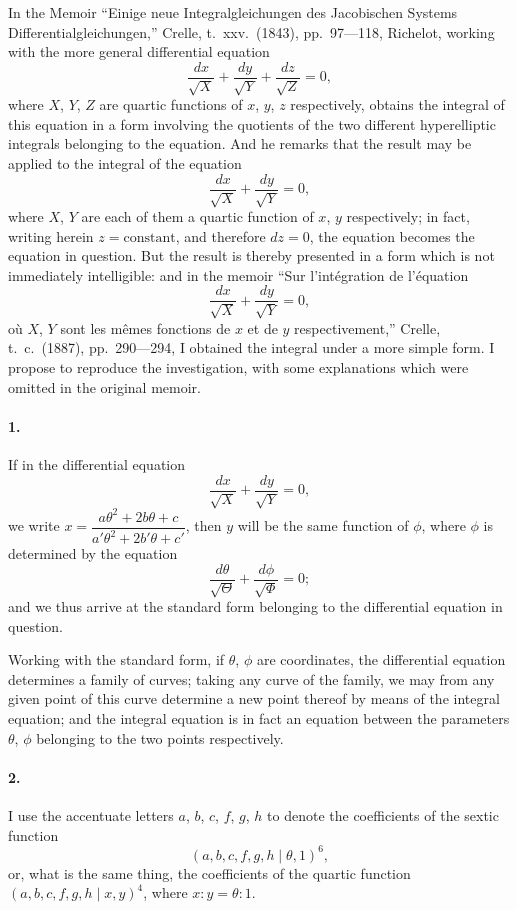 \documentclass[11pt,a4paper]{book}
\begin{document}
In the Memoir ``Einige neue Integralgleichungen des Jacobischen Systems Differentialgleichungen,'' Crelle, t.~xxv.~(1843), pp.~97---118, Richelot, working with the more general differential equation
\[
\frac{dx}{\sqrt{X}} + \frac{dy}{\sqrt{Y}} + \frac{dz}{\sqrt{Z}} = 0,
\]
where $X$, $Y$, $Z$ are quartic functions of $x$, $y$, $z$ respectively, obtains the integral of this equation in a form involving the quotients of the two different hyperelliptic integrals belonging to the equation. And he remarks that the result may be applied to the integral of the equation
\[
\frac{dx}{\sqrt{X}} + \frac{dy}{\sqrt{Y}} = 0,
\]
where $X$, $Y$ are each of them a quartic function of $x$, $y$ respectively; in fact, writing herein $z = \text{constant}$, and therefore $dz = 0$, the equation becomes the equation in question. But the result is thereby presented in a form which is not immediately intelligible: and in the memoir ``Sur l'int\'egration de l'\'equation
\[
\frac{dx}{\sqrt{X}} + \frac{dy}{\sqrt{Y}} = 0,
\]
o\`u $X$, $Y$ sont les m\^emes fonctions de $x$ et de $y$ respectivement,'' Crelle, t.~c.~(1887), pp.~290---294, I obtained the integral under a more simple form. I propose to reproduce the investigation, with some explanations which were omitted in the original memoir.

\paragraph{1.} If in the differential equation
\[
\frac{dx}{\sqrt{X}} + \frac{dy}{\sqrt{Y}} = 0,
\]
we write $x = \dfrac{a\theta^2 + 2b\theta + c}{a'\theta^2 + 2b'\theta + c'}$, then $y$ will be the same function of $\phi$, where $\phi$ is determined by the equation
\[
\frac{d\theta}{\sqrt{\Theta}} + \frac{d\phi}{\sqrt{\Phi}} = 0;
\]
and we thus arrive at the standard form belonging to the differential equation in question.

Working with the standard form, if $\theta$, $\phi$ are coordinates, the differential equation determines a family of curves; taking any curve of the family, we may from any given point of this curve determine a new point thereof by means of the integral equation; and the integral equation is in fact an equation between the parameters $\theta$, $\phi$ belonging to the two points respectively.

\paragraph{2.} I use the accentuate letters $a$, $b$, $c$, $f$, $g$, $h$ to denote the coefficients of the sextic function
\[
(a, b, c, f, g, h\mid\theta, 1)^6,
\]
or, what is the same thing, the coefficients of the quartic function $(a, b, c, f, g, h\mid x, y)^4$, where $x : y = \theta : 1$.
\end{document}
